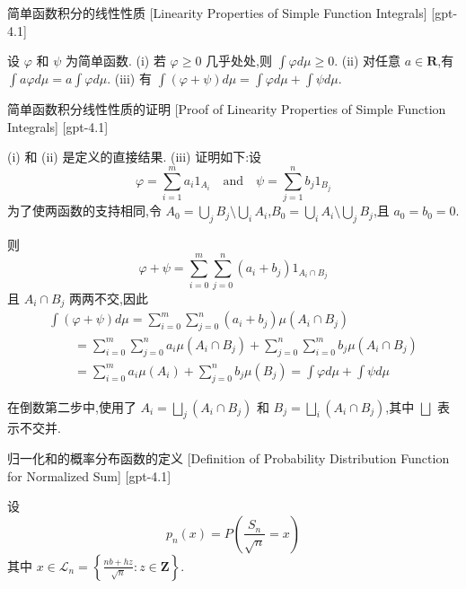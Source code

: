 \documentclass[UTF8]{ctexart}
\begin{document}
    
    
    \begin{lma}
        {简单函数积分的线性性质}
        [Linearity Properties of Simple Function Integrals]
        [gpt-4.1]
        
设 $\varphi$ 和 $\psi$ 为简单函数.
(i) 若 $\varphi \geq 0$ 几乎处处,则 $\int \varphi d\mu \geq 0$.
(ii) 对任意 $a \in \mathbf{R}$,有 $\int a\varphi d\mu = a \int \varphi d\mu$.
(iii) 有 $\int (\varphi + \psi) d\mu = \int \varphi d\mu + \int \psi d\mu$.

    \end{lma}
    
    
    
    \begin{prf}
        {简单函数积分线性性质的证明}
        [Proof of Linearity Properties of Simple Function Integrals]
        [gpt-4.1]
        
(i) 和 (ii) 是定义的直接结果.
(iii) 证明如下:设
\[
\varphi = \sum_{i=1}^m a_i 1_{A_i} \quad \text{and} \quad \psi = \sum_{j=1}^n b_j 1_{B_j}
\]
为了使两函数的支持相同,令 $A_0 = \bigcup_{j} B_j \setminus \bigcup_{i} A_i$,$B_0 = \bigcup_{i} A_i \setminus \bigcup_{j} B_j$,且 $a_0 = b_0 = 0$.

则
\[
\varphi + \psi = \sum_{i=0}^m \sum_{j=0}^n (a_i + b_j) 1_{A_i \cap B_j}
\]
且 $A_i \cap B_j$ 两两不交,因此
\[
\begin{array}{l}
\displaystyle \int (\varphi + \psi) d\mu = \sum_{i=0}^m \sum_{j=0}^n (a_i + b_j) \mu(A_i \cap B_j) \\
\displaystyle \qquad = \sum_{i=0}^m \sum_{j=0}^n a_i \mu(A_i \cap B_j) + \sum_{j=0}^n \sum_{i=0}^m b_j \mu(A_i \cap B_j) \\
\displaystyle \qquad = \sum_{i=0}^m a_i \mu(A_i) + \sum_{j=0}^n b_j \mu(B_j) = \int \varphi d\mu + \int \psi d\mu
\end{array}
\]

在倒数第二步中,使用了 $A_i = \bigsqcup_j (A_i \cap B_j)$ 和 $B_j = \bigsqcup_i (A_i \cap B_j)$,其中 $\bigsqcup$ 表示不交并.

    \end{prf}
    
    
    
    \begin{dfn}
        {归一化和的概率分布函数的定义}
        [Definition of Probability Distribution Function for Normalized Sum]
        [gpt-4.1]
        
设
\[
p _ { n } ( x ) = P \left( \frac{S _ { n }}{ \sqrt{ n } } = x \right)
\]
其中 $x \in {\mathcal{L}}_n = \left\{ \frac{ n b + h z }{ \sqrt{ n } } : z \in \mathbf{Z} \right\}$.

    \end{dfn}
    
\end{document}
